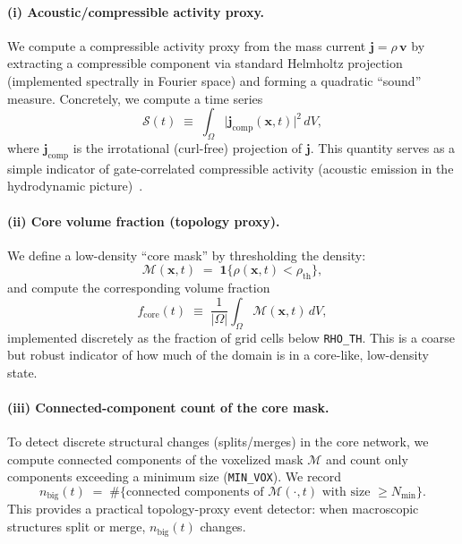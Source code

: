 \documentclass[11pt]{article}
\theoremstyle{plain}
\theoremstyle{definition}
\theoremstyle{remark}
\newcommand{\vfield}{\mathbf{v}}
\begin{document}
\paragraph{(i) Acoustic/compressible activity proxy.}
We compute a compressible activity proxy from the mass current $\mathbf{j}=\rho\,\vfield$ by extracting a
compressible component via standard Helmholtz projection (implemented spectrally in Fourier space) and
forming a quadratic ``sound'' measure. Concretely, we compute a time series
\begin{equation}\label{eq:wp1_sound_proxy}
  \mathcal{S}(t) \;\equiv\; \int_{\Omega} \big|\mathbf{j}_{\mathrm{comp}}(\mathbf{x},t)\big|^2\,dV,
\end{equation}
where $\mathbf{j}_{\mathrm{comp}}$ is the irrotational (curl-free) projection of $\mathbf{j}$.
This quantity serves as a simple indicator of gate-correlated compressible activity (acoustic emission
in the hydrodynamic picture)~\cite{Norris:Paper6}.

\paragraph{(ii) Core volume fraction (topology proxy).}
We define a low-density ``core mask'' by thresholding the density:
\begin{equation}\label{eq:wp1_core_mask}
  \mathcal{M}(\mathbf{x},t) \;=\; \mathbf{1}\{\rho(\mathbf{x},t) < \rho_{\text{th}}\},
\end{equation}
and compute the corresponding volume fraction
\begin{equation}\label{eq:wp1_core_frac}
  f_{\text{core}}(t) \;\equiv\; \frac{1}{|\Omega|}\int_{\Omega}\mathcal{M}(\mathbf{x},t)\,dV,
\end{equation}
implemented discretely as the fraction of grid cells below \texttt{RHO\_TH}. This is a coarse but
robust indicator of how much of the domain is in a core-like, low-density state.

\paragraph{(iii) Connected-component count of the core mask.}
To detect discrete structural changes (splits/merges) in the core network, we compute connected
components of the voxelized mask $\mathcal{M}$ and count only components exceeding a minimum size
(\texttt{MIN\_VOX}). We record
\begin{equation}\label{eq:wp1_nbig}
  n_{\text{big}}(t) \;=\; \#\{\text{connected components of }\mathcal{M}(\cdot,t)\text{ with size }\ge N_{\min}\}.
\end{equation}
This provides a practical topology-proxy event detector: when macroscopic structures split or merge,
$n_{\text{big}}(t)$ changes.
\end{document}
